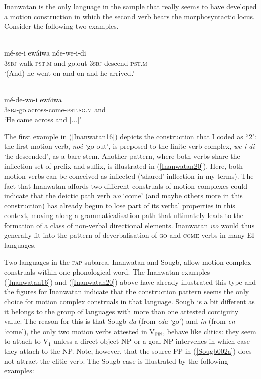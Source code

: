 Inanwatan is the only language in the sample that really seems to have developed a motion construction in which the second verb bears the morphosyntactic locus. Consider the following two examples.

\ea \label{Inanwatan16}
\\
\gll mé-se-i ewáiwa nóe-we-i-di \\
\textsc{3}\textsc{sbj}-walk-\textsc{pst}.\textsc{m} and go.out-\textsc{3}\textsc{sbj}-descend-\textsc{pst}.\textsc{m} \\
\glft `(And) he went on and on and he arrived.'\\ 
\z

\ea \label{Inanwatan20}
\\
\gll mé-de-wo-i ewáiwa \\
\textsc{3}\textsc{sbj}-go.across-come-\textsc{pst}.\textsc{sg}.\textsc{m} and \\
\glft `He came across and [...]'\\ 
\z

The first example in (\ref{Inanwatan16}) depicts the construction that I coded as ``2": the first motion verb, \textit{noé} `go out', is preposed to the finite verb complex, \textit{we-i-di} `he descended', as a bare stem. Another pattern, where both verbs share the inflection set of prefix and suffix, is illustrated in (\ref{Inanwatan20}). Here, both motion verbs can be conceived as inflected (`shared' inflection in my terms). The fact that Inanwatan affords two different construals of motion complexes could indicate that the deictic path verb \textit{wo} `come' (and maybe others more in this construction) has already begun to lose part of its verbal properties in this context, moving along a grammaticalisation path that ultimately leads to the formation of a class of non-verbal directional elements. Inanwatan \textit{wo} would thus generally fit into the pattern of deverbalisation of \textsc{go} and \textsc{come} verbs in many EI languages.

Two languages in the \textsc{pap} subarea, Inanwatan and Sougb, allow motion complex construals within one phonological word. The Inanwatan examples (\ref{Inanwatan16}) and (\ref{Inanwatan20}) above have already illustrated this type and the figures for Inanwatan indicate that the construction pattern seems the only choice for motion complex construals in that language. Sougb is a bit different as it belongs to the group of languages with more than one attested contiguity value. The reason for this is that Sougb \textit{da} (from \textit{eda} `go') and \textit{in} (from \textit{en} `come'), the only two motion verbs attested in V$_{\textsc{fin}}$, behave like clitics: they seem to attach to V$_{1}$ unless a direct object NP or a goal NP intervenes in which case they attach to the NP. Note, however, that the source PP in (\ref{Sougb002a}) does not attract the clitic verb. The Sougb case is illustrated by the following examples:

